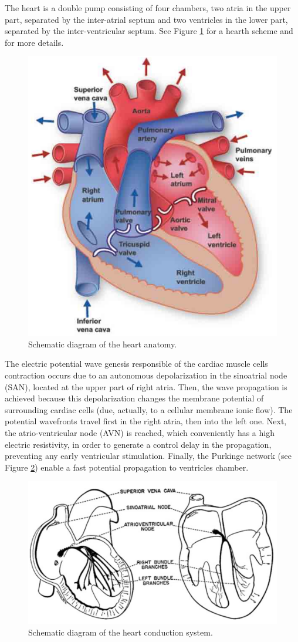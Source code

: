 \label{Some_Basis_on_Anatomy_and_Electrophysiology}

The heart is a double pump consisting of four chambers, two atria in the upper part, separated by the inter-atrial septum and two ventricles in the lower part, separated by the inter-ventricular septum. See Figure \ref{corazon} for a hearth scheme and \cite{electrofis} for more details. 

\begin{figure}[!htbp] %
\centering
\includegraphics[height = 6 cm]{fig/fundamentals-corazon}
\caption{Schematic diagram of the heart anatomy.} \label{corazon}
\end{figure}

The electric potential wave genesis responsible of the cardiac muscle cells contraction occurs due to an autonomous depolarization in the sinoatrial node (SAN), located at the upper part of right atria. Then, the wave propagation is achieved because this depolarization changes the membrane potential of surrounding cardiac cells (due,  actually, to a cellular membrane ionic flow). The potential wavefronts travel first in the right atria, then into the left one. Next, the atrio-ventricular node (AVN) is reached, which conveniently has a high electric resistivity, in order to generate a control delay in the propagation, preventing any early ventricular stimulation. Finally, the Purkinge network (see Figure \ref{corazon_conduccion}) enable a fast potential propagation to ventricles chamber.

\begin{figure}[!htbp]%
\centering
\includegraphics[height = 6 cm]{fig/fundamentals-sistema_de_conduccion}
\caption{Schematic diagram of the heart conduction system.} \label{corazon_conduccion}
\end{figure}

